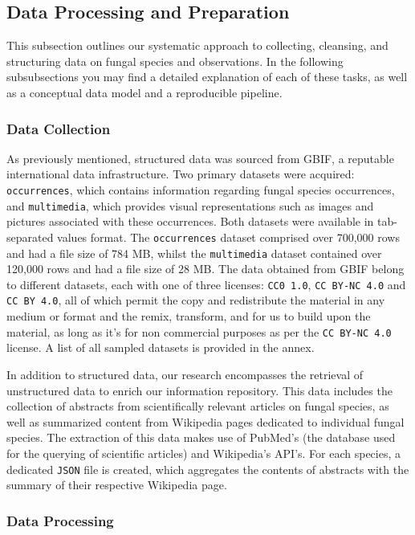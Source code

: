 \subsection{Data Processing and Preparation}

This subsection outlines our systematic approach to collecting, cleansing, and structuring data on fungal species and observations. In the following subsubsections you may find a detailed explanation of each of these tasks, as well as a conceptual data model and a reproducible pipeline.

\subsubsection{\textbf{Data Collection}}

As previously mentioned, structured data was sourced from GBIF, a reputable international data infrastructure. Two primary datasets were acquired: \texttt{occurrences}, which contains information regarding fungal species occurrences, and \texttt{multimedia}, which provides visual representations such as images and pictures associated with these occurrences. Both datasets were available in tab-separated values format. The \texttt{occurrences} dataset comprised over 700,000 rows and had a file size of 784 MB, whilst the \texttt{multimedia} dataset contained over 120,000 rows and had a file size of 28 MB. The data obtained from GBIF belong to different datasets, each with one of three licenses: \texttt{CC0 1.0}, \texttt{CC BY-NC 4.0} and \texttt{CC BY 4.0}, all of which permit the copy and redistribute the material in any medium or format and the remix, transform, and for us to build upon the material, as long as it's for non commercial purposes as per the \texttt{CC BY-NC 4.0} license. A list of all sampled datasets is provided in the annex.

In addition to structured data, our research encompasses the retrieval of unstructured data to enrich our information repository. This data includes the collection of abstracts from scientifically relevant articles on fungal species, as well as summarized content from Wikipedia pages dedicated to individual fungal species. The extraction of this data makes use of PubMed's (the database used for the querying of scientific articles) and Wikipedia's API's. For each species, a dedicated \texttt{JSON} file is created, which aggregates the contents of abstracts with the summary of their respective Wikipedia page.

\subsubsection{\textbf{Data Processing}}

